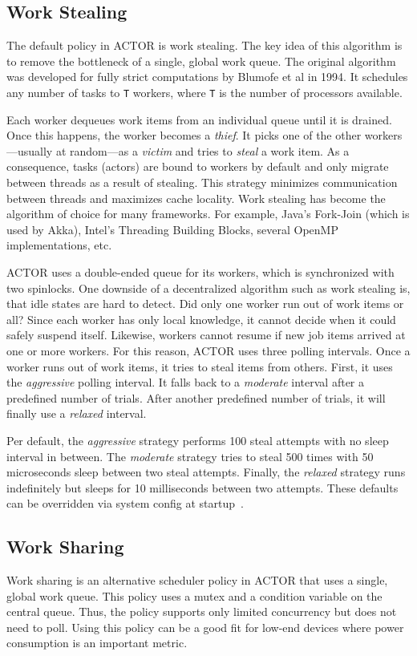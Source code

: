 \subsection{Work Stealing}
\label{work-stealing}

The default policy in ACTOR is work stealing. The key idea of this algorithm is
to remove the bottleneck of a single, global work queue.  The original
algorithm was developed for fully strict computations by Blumofe et al in 1994.
It schedules any number of tasks to \lstinline^T^ workers, where \lstinline^T^
is the number of processors available.


Each worker dequeues work items from an individual queue until it is drained.
Once this happens, the worker becomes a \emph{thief}. It picks one of the other
workers---usually at random---as a \emph{victim} and tries to \emph{steal} a
work item. As a consequence, tasks (actors) are bound to workers by default and
only migrate between threads as a result of stealing. This strategy minimizes
communication between threads and maximizes cache locality. Work stealing has
become the algorithm of choice for many frameworks. For example, Java's
Fork-Join (which is used by Akka), Intel's Threading Building Blocks, several
OpenMP implementations, etc.

ACTOR uses a double-ended queue for its workers, which is synchronized with two
spinlocks. One downside of a decentralized algorithm such as work stealing is,
that idle states are hard to detect. Did only one worker run out of work items
or all? Since each worker has only local knowledge, it cannot decide when it
could safely suspend itself. Likewise, workers cannot resume if new job items
arrived at one or more workers. For this reason, ACTOR uses three polling
intervals. Once a worker runs out of work items, it tries to steal items from
others. First, it uses the \emph{aggressive} polling interval. It falls back to
a \emph{moderate} interval after a predefined number of trials. After another
predefined number of trials, it will finally use a \emph{relaxed} interval.

Per default, the \emph{aggressive} strategy performs 100 steal attempts with no
sleep interval in between. The \emph{moderate} strategy tries to steal 500
times with 50 microseconds sleep between two steal attempts. Finally, the
\emph{relaxed} strategy runs indefinitely but sleeps for 10 milliseconds
between two attempts. These defaults can be overridden via system config at
startup~.

\subsection{Work Sharing}
\label{work-sharing}

Work sharing is an alternative scheduler policy in ACTOR that uses a single,
global work queue. This policy uses a mutex and a condition variable on the
central queue. Thus, the policy supports only limited concurrency but does not
need to poll. Using this policy can be a good fit for low-end devices where
power consumption is an important metric.

